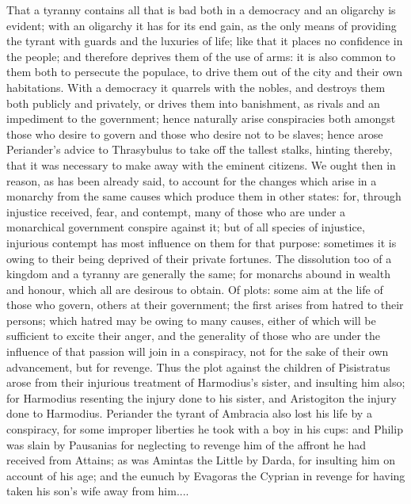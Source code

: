 That a tyranny contains all that is bad both in a democracy and an
oligarchy is evident; with an oligarchy it has for its end gain, as the
only means of providing the tyrant with guards and the luxuries of life;
like that it places no confidence in the people; and therefore deprives
them of the use of arms: it is also common to them both to persecute the
populace, to drive them out of the city and their own habitations. With a
democracy it quarrels with the nobles, and destroys them both publicly and
privately, or drives them into banishment, as rivals and an impediment to
the government; hence naturally arise conspiracies both amongst those who
desire to govern and those who desire not to be slaves; hence arose
Periander's advice to Thrasybulus to take off the tallest stalks, hinting
thereby, that it was necessary to make away with the eminent citizens. We
ought then in reason, as has been already said, to account for the changes
which arise in a monarchy from the same causes which produce them in other
states: for, through injustice received, fear, and contempt, many of those
who are under a monarchical government conspire against it; but of all
species of injustice, injurious contempt has most influence on them for
that purpose: sometimes it is owing to their being deprived of their
private fortunes. The dissolution too of a kingdom and a tyranny are
generally the same; for monarchs abound in wealth and honour, which all
are desirous to obtain. Of plots: some aim at the life of those who
govern, others at their government; the first arises from hatred to their
persons; which hatred may be owing to many causes, either of which will be
sufficient to excite their anger, and the generality of those who are
under the influence of that passion will join in a conspiracy, not for the
sake of their own advancement, but for revenge. Thus the plot against the
children of Pisistratus arose from their injurious treatment of
Harmodius's sister, and insulting him also; for Harmodius resenting the
injury done to his sister, and Aristogiton the injury done to Harmodius.
Periander the tyrant of Ambracia also lost his life by a conspiracy, for
some improper liberties he took with a boy in his cups: and Philip was
slain by Pausanias for neglecting to revenge him of the affront he had
received from Attains; as was Amintas the Little by Darda, for insulting
him on account of his age; and the eunuch by Evagoras the Cyprian in
revenge for having taken his son's wife away from him....

